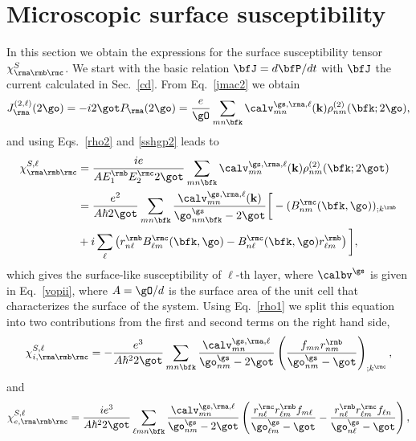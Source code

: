 \documentclass[floatfix,prb,aps,superscriptaddress,11pt,preprint,letterpaper]{revtex4}
\begin{document}


\section{Microscopic surface susceptibility}
In this section we obtain the expressions for the 
surface susceptibility tensor $\chi^S_{\rma\rmb\rmc}$.
We start with the basic relation $\bfJ=d\bfP/dt$ 
with $\bfJ$ the current calculated in Sec.~\ref{cd}. From Eq.~\eqref{jmac2} 
we obtain
\begin{equation}\label{Pjikn}
J_{\rma}^{(2,\ell)}(2\go)=-i2\got P_{\rma}(2\go)
=\frac{e}{\gO}
\sum_{mn\bfk}
\calv^{\gs,\rma,\ell}_{mn}(\mathbf{k})
\rho^{(2)}_{nm}(\bfk;2\go)
,
\end{equation}
and using Eqs.~\eqref{rho2} and \eqref{sshgp2} leads to
\begin{align}\label{Pjikn2}
\chi^{S,\ell}_{\rma\rmb\rmc}
&=
\frac{ie}{A E^{\rmb}_1E^{\rmc}_2 2\got}
\sum_{mn\bfk}
\calv^{\gs,\rma,\ell}_{mn}(\mathbf{k})
\rho^{(2)}_{nm}(\bfk;2\got)
\nonumber \\
&=
\frac{e^2}{A\hbar2\got}
\sum_{mn\bfk}
\frac{\calv^{\gs,\rma,\ell}_{mn}(\mathbf{k})}
{\go^\gs_{nm\bfk}-2\got}
\bigg[
-(B_{nm}^{\rmc}(\bfk,\go))_{;k^{\rmb}}
\nonumber \\
&
+i\sum_\ell\left(r_{n\ell}^{\rmb}B_{\ell m}^{\rmc}(\bfk,\go) -
  B_{n\ell}^{\rmc}(\bfk,\go) 
  r_{\ell m}^{\rmb}\right)
\bigg]
,
\end{align}
which gives the surface-like susceptibility of $\ell$-th layer, where 
$\calbv^\gs$ is given in Eq.~\eqref{vopii},
where $A=\gO/d$ is the surface area of the unit
cell that characterizes the surface of the system.
Using Eq.~\eqref{rho1} we
split this equation into
two contributions from the first and second terms on the right hand side,
\begin{equation}\label{chii}
\chi_{i,\rma\rmb\rmc}^{S,\ell}
=-\frac{e^3}{A\hbar^22\got}\sum_{mn\bfk}
\frac{\calv_{mn}^{\gs,\rma,\ell}}{\go^\gs_{nm}-2\got}
\left(\frac{f_{mn}r_{nm}^{\rmb}}{\go^\gs_{nm}-\got}\right)_{;k^{\rmc}},
\end{equation} 
and 
\begin{equation}\label{chie}
\chi_{e,\rma\rmb\rmc}^{S,\ell}
=\frac{ie^3}{A\hbar^22\got}\sum_{\ell mn\bfk}
\frac{\calv_{mn}^{\gs,\rma,\ell}}{\go^\gs_{nm}-2\got}
\left(
\frac{r_{n\ell}^{\rmc} r_{\ell m}^{\rmb} 
f_{m\ell}}{\go^\gs_{\ell m}-\got}
-\frac{r_{n\ell}^{\rmb} r_{\ell m}^{\rmc} 
f_{\ell n}}{\go^\gs_{n \ell}-\got}
\right),
\end{equation} 
\end{document}
